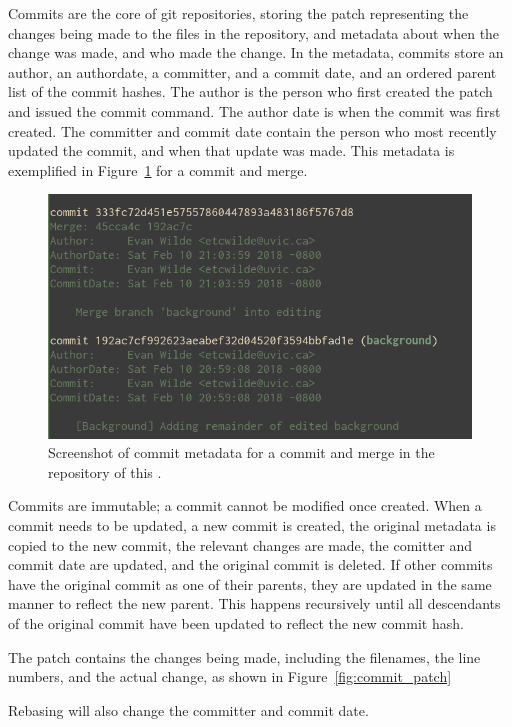Commits are the core of git repositories, storing the patch
representing the changes being made to the files in the repository, and
metadata about when the change was made, and who made the change.
In the metadata, commits store an author, an authordate, a committer,
and a commit date, and an ordered parent list of the commit hashes.
The author is the person who first created the patch and issued the
commit command.
The author date is when the commit was first created.
The committer and commit date contain the person who most recently
updated the commit, and when that update was made.
This metadata is exemplified in Figure~\ref{fig:commit_metadata} for a
commit and merge.

\begin{figure}[htpb]
  \centering
  \includegraphics[width=0.8\linewidth]{Figures/background/commit_metadata.png}
  \caption{Screenshot of commit metadata for a commit and merge in the
    repository of this \paper{}.}
  \label{fig:commit_metadata}
\end{figure}

Commits are immutable; a commit cannot be modified once created.
When a commit needs to be updated, a new commit is created,
the original metadata is copied to the new commit,
the relevant changes are made, the comitter
and commit date are updated, and the original commit is deleted.
If other commits have the original commit as one of their parents, they
are updated in the same manner to reflect the new parent.
This happens recursively until all descendants of the original commit
have been updated to reflect the new commit hash.

The patch contains the changes being made, including the
filenames, the line numbers, and the actual change, as shown in
Figure~\ref{fig:commit_patch}

Rebasing will also change the committer and commit date.

